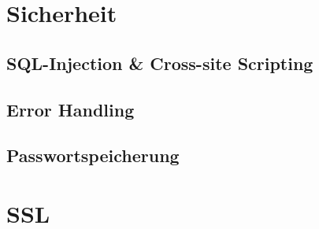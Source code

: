 \documentclass[12pt]{scrartcl}
\begin{document}
\section{Sicherheit}
\subsection{SQL-Injection \& Cross-site Scripting}


\subsection{Error Handling}


\subsection{Passwortspeicherung}


\section{SSL}
\end{document}
